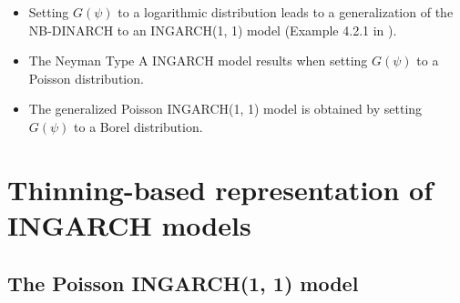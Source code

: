 \documentclass[review]{elsarticle}
\begin{document}
\begin{itemize}
\item Setting $G(\psi)$ to a logarithmic distribution %
leads to a generalization of the NB-DINARCH \cite{Xu2012} to an INGARCH(1, 1) model (Example 4.2.1 in \cite{Weiss2018}). %
\item The Neyman Type A INGARCH model \cite{Goncalves2015a} results when setting $G(\psi)$ to a Poisson distribution. %
\item The generalized Poisson INGARCH(1, 1) model \cite{Zhu2012} is obtained by setting $G(\psi)$ to a Borel distribution. %
\end{itemize}

\section{Thinning-based representation of INGARCH models}%
\label{sec:alternative_formulation}

\subsection{The Poisson INGARCH(1, 1) model}
\label{subsec:poisson11}
\end{document}
